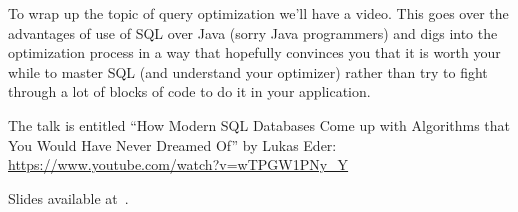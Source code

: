 




To wrap up the topic of query optimization we'll have a video. This goes over the advantages of use of SQL over Java (sorry Java programmers) and digs into the optimization process in a way that hopefully convinces you that it is worth your while to master SQL (and understand your optimizer) rather than try to fight through a lot of blocks of code to do it in your application.

The talk is entitled ``How Modern SQL Databases Come up with Algorithms that You Would Have Never Dreamed Of'' by Lukas Eder: \url{https://www.youtube.com/watch?v=wTPGW1PNy_Y}

Slides available at~\cite{lukaseder}.




